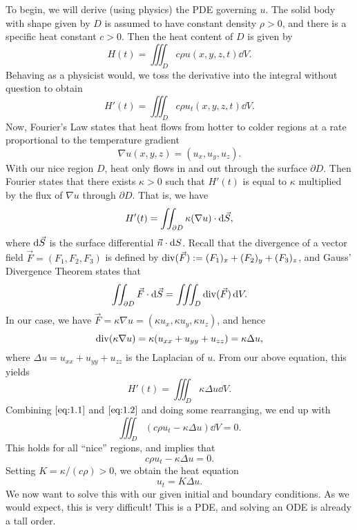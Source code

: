 To begin, we will derive (using physics) the PDE governing $u$. The 
solid body with shape given by $D$ is assumed to have constant density
$\rho > 0$, and there is a specific heat constant $c > 0$. Then the 
heat content of $D$ is given by
\[ H(t) = \iiint_D c\rho u(x, y, z, t)\dd V. \] 
Behaving as a physicist would, we toss the derivative into the integral 
without question to obtain 
\begin{equation}\label{eq:1.1}
    H'(t) = \iiint_D c\rho u_t(x, y, z, t)\dd V. 
\end{equation}
Now, Fourier's Law states that heat flows from hotter to colder regions at 
a rate proportional to the temperature gradient 
\[ \nabla u(x, y, z) = (u_x, u_y, u_z). \] 
With our nice region $D$, heat only flows in and out through the surface 
$\partial D$. Then Fourier states that there exists $\kappa > 0$ such that 
$H'(t)$ is equal to $\kappa$ multiplied by the flux of $\nabla u$ through 
$\partial D$. That is, we have 
\[ H'(t) = \iint_{\partial D} \kappa(\nabla u) \cdot {\rm d}\vec{S}, \] 
where ${\rm d}\vec{S}$ is the surface differential $\vec{n} \cdot {\rm d}S$. 
Recall that the divergence of a vector field $\vec{F} = (F_1, F_2, F_3)$ is 
defined by $\operatorname{div}(\vec{F}) := (F_1)_x + (F_2)_y + (F_3)_z$, and 
Gauss' Divergence Theorem states that 
\[ \iint_{\partial D} \vec F \cdot {\rm d}\vec S = \iiint_D 
\operatorname{div}(\vec{F})\,\mathrm{d} V. \] 
In our case, we have $\vec F = \kappa\nabla u = (\kappa u_x, \kappa u_y, 
\kappa u_z)$, and hence 
\[ \operatorname{div}(\kappa\nabla u) = \kappa(u_{xx} + u_{yy} + u_{zz}) = \kappa\Delta u, \] 
where $\Delta u = u_{xx} + u_{yy} + u_{zz}$ is the Laplacian of $u$. From 
our above equation, this yields 
\begin{equation}\label{eq:1.2}
    H'(t) = \iiint_D \kappa\Delta u\dd V.
\end{equation}
Combining $\eqref{eq:1.1}$ and $\eqref{eq:1.2}$ and doing some rearranging, 
we end up with 
\[ \iiint_D (c\rho u_t - \kappa\Delta u)\dd V = 0. \] 
This holds for all ``nice'' regions, and implies that 
\[ c\rho u_t - \kappa\Delta u = 0. \] 
Setting $K = \kappa/(c\rho) > 0$, we obtain the heat equation 
\[ u_t = K\Delta u. \] 
We now want to solve this with our given initial and boundary conditions. 
As we would expect, this is very difficult! This is a PDE, and solving an
ODE is already a tall order. 

